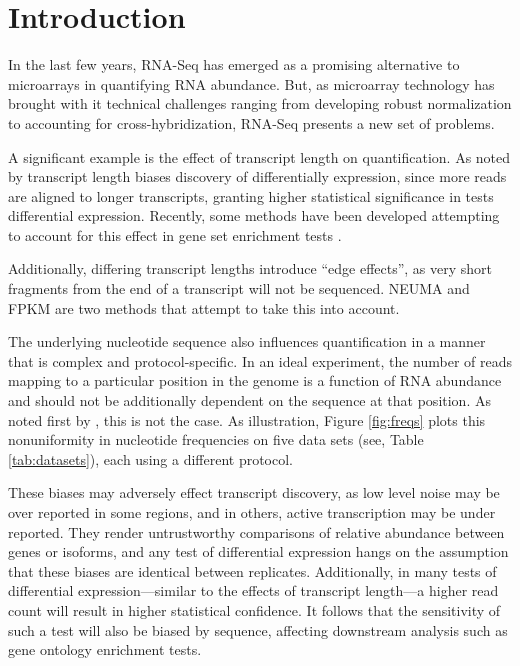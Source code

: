 \documentclass{bioinfo}
\begin{document}
\section{Introduction}

In the last few years, RNA-Seq has emerged as a promising alternative to
microarrays in quantifying RNA abundance. But, as microarray technology has
brought with it technical challenges ranging from developing robust
normalization to accounting for cross-hybridization, RNA-Seq presents a new set
of problems.

A significant example is the effect of transcript length on quantification.  As
noted by \citet{Oshlack2009} transcript length biases discovery of
differentially expression, since more reads are aligned to longer transcripts,
granting higher statistical significance in tests differential expression.
Recently, some methods have been developed attempting to account for this effect
in gene set enrichment tests \citep{Young2010,Gao2011}.

Additionally,
differing transcript lengths introduce ``edge effects'', as very short fragments
from the end of a transcript will not be sequenced. NEUMA \cite{Lee2010} and
FPKM \cite{Trapnell2010} are two methods that attempt to take this into account.

The underlying nucleotide sequence also influences quantification in a manner
that is complex and protocol-specific. In an ideal experiment, the number of
reads mapping to a particular position in the genome is a function of RNA
abundance and should not be additionally dependent on the sequence at that
position. As noted first by \citet{Dohm2008}, this is not the case.  As
illustration, Figure \ref{fig:freqs} plots this nonuniformity in nucleotide
frequencies on five data sets (see, Table \ref{tab:datasets}), each using a
different protocol.


These biases may adversely effect transcript discovery, as low level noise may
be over reported in some regions, and in others, active transcription may be
under reported. They render untrustworthy comparisons of relative abundance
between genes or isoforms, and any test of differential expression hangs on the
assumption that these biases are identical between replicates.  Additionally, in
many tests of differential expression---similar to the effects of transcript
length---a higher read count will result in higher statistical confidence. It
follows that the sensitivity of such a test will also be biased by sequence,
affecting downstream analysis such as gene ontology enrichment tests.
\end{document}
